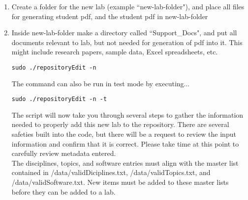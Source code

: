 \documentclass[justified]{book}
\begin{document}
\begin{enumerate}
\item Create a folder for the new lab (example ``new-lab-folder"), and place all files for generating student pdf, and the student pdf in new-lab-folder
\item Inside new-lab-folder make a directory called ``Support\_Docs", and put all documents relevant to lab, but not needed for generation of pdf into it. This might include research papers, sample data, Excel spreadsheets, etc.



\begin{lstlisting}[backgroundcolor = \color{light-gray}]
sudo ./repositoryEdit -n
\end{lstlisting}

The command can also be run in test mode by executing...

\begin{lstlisting}[backgroundcolor = \color{light-gray}]
sudo ./repositoryEdit -n -t
\end{lstlisting}

The script will now take you through several steps to gather the information needed to properly add this new lab to the repository. There are several safeties built into the code, but there will be a request to review the input information and confirm that it is correct. Please take time at this point to carefully review metadata entered.\\

The disciplines, topics, and software entries must align with the master list contained in /data/validDiciplines.txt, /data/validTopics.txt, and /data/validSoftware.txt. New items must be added to these master lists before they can be added to a lab.


\end{enumerate}
\end{document}
